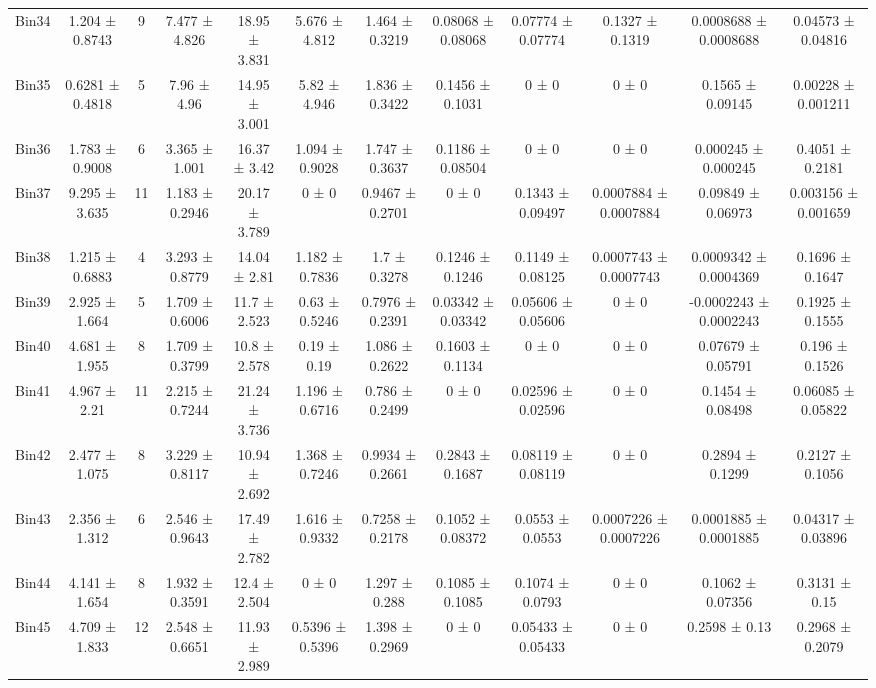 \begin{tabular}{@{\extracolsep{4pt}}lccccccccccc@{}}
     Bin34 & 1.204 ± 0.8743 & 9 & 7.477 ± 4.826 & 18.95 ± 3.831 & 5.676 ± 4.812 & 1.464 ± 0.3219 & 0.08068 ± 0.08068 & 0.07774 ± 0.07774 & 0.1327 ± 0.1319 & 0.0008688 ± 0.0008688 & 0.04573 ± 0.04816 \\ 
     Bin35 & 0.6281 ± 0.4818 & 5 & 7.96 ± 4.96 & 14.95 ± 3.001 & 5.82 ± 4.946 & 1.836 ± 0.3422 & 0.1456 ± 0.1031 & 0 ± 0 & 0 ± 0 & 0.1565 ± 0.09145 & 0.00228 ± 0.001211 \\ 
     Bin36 & 1.783 ± 0.9008 & 6 & 3.365 ± 1.001 & 16.37 ± 3.42 & 1.094 ± 0.9028 & 1.747 ± 0.3637 & 0.1186 ± 0.08504 & 0 ± 0 & 0 ± 0 & 0.000245 ± 0.000245 & 0.4051 ± 0.2181 \\ 
     Bin37 & 9.295 ± 3.635 & 11 & 1.183 ± 0.2946 & 20.17 ± 3.789 & 0 ± 0 & 0.9467 ± 0.2701 & 0 ± 0 & 0.1343 ± 0.09497 & 0.0007884 ± 0.0007884 & 0.09849 ± 0.06973 & 0.003156 ± 0.001659 \\ 
     Bin38 & 1.215 ± 0.6883 & 4 & 3.293 ± 0.8779 & 14.04 ± 2.81 & 1.182 ± 0.7836 & 1.7 ± 0.3278 & 0.1246 ± 0.1246 & 0.1149 ± 0.08125 & 0.0007743 ± 0.0007743 & 0.0009342 ± 0.0004369 & 0.1696 ± 0.1647 \\ 
     Bin39 & 2.925 ± 1.664 & 5 & 1.709 ± 0.6006 & 11.7 ± 2.523 & 0.63 ± 0.5246 & 0.7976 ± 0.2391 & 0.03342 ± 0.03342 & 0.05606 ± 0.05606 & 0 ± 0 & -0.0002243 ± 0.0002243 & 0.1925 ± 0.1555 \\ 
     Bin40 & 4.681 ± 1.955 & 8 & 1.709 ± 0.3799 & 10.8 ± 2.578 & 0.19 ± 0.19 & 1.086 ± 0.2622 & 0.1603 ± 0.1134 & 0 ± 0 & 0 ± 0 & 0.07679 ± 0.05791 & 0.196 ± 0.1526 \\ 
     Bin41 & 4.967 ± 2.21 & 11 & 2.215 ± 0.7244 & 21.24 ± 3.736 & 1.196 ± 0.6716 & 0.786 ± 0.2499 & 0 ± 0 & 0.02596 ± 0.02596 & 0 ± 0 & 0.1454 ± 0.08498 & 0.06085 ± 0.05822 \\ 
     Bin42 & 2.477 ± 1.075 & 8 & 3.229 ± 0.8117 & 10.94 ± 2.692 & 1.368 ± 0.7246 & 0.9934 ± 0.2661 & 0.2843 ± 0.1687 & 0.08119 ± 0.08119 & 0 ± 0 & 0.2894 ± 0.1299 & 0.2127 ± 0.1056 \\ 
     Bin43 & 2.356 ± 1.312 & 6 & 2.546 ± 0.9643 & 17.49 ± 2.782 & 1.616 ± 0.9332 & 0.7258 ± 0.2178 & 0.1052 ± 0.08372 & 0.0553 ± 0.0553 & 0.0007226 ± 0.0007226 & 0.0001885 ± 0.0001885 & 0.04317 ± 0.03896 \\ 
     Bin44 & 4.141 ± 1.654 & 8 & 1.932 ± 0.3591 & 12.4 ± 2.504 & 0 ± 0 & 1.297 ± 0.288 & 0.1085 ± 0.1085 & 0.1074 ± 0.0793 & 0 ± 0 & 0.1062 ± 0.07356 & 0.3131 ± 0.15 \\ 
     Bin45 & 4.709 ± 1.833 & 12 & 2.548 ± 0.6651 & 11.93 ± 2.989 & 0.5396 ± 0.5396 & 1.398 ± 0.2969 & 0 ± 0 & 0.05433 ± 0.05433 & 0 ± 0 & 0.2598 ± 0.13 & 0.2968 ± 0.2079 \\ 

\end{tabular}
